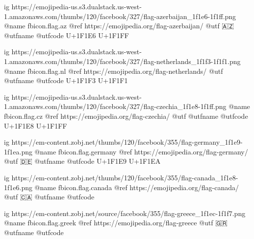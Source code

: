 	ig https://emojipedia-us.s3.dualstack.us-west-1.amazonaws.com/thumbs/120/facebook/327/flag-azerbaijan_1f1e6-1f1ff.png
	@name fbicon.flag.az
	@ref https://emojipedia.org/flag-azerbaijan/
	@utf 🇦🇿
	@utfname
	@utfcode U+1F1E6 U+1F1FF

	ig https://emojipedia-us.s3.dualstack.us-west-1.amazonaws.com/thumbs/120/facebook/327/flag-netherlands_1f1f3-1f1f1.png
	@name fbicon.flag.nl
	@ref https://emojipedia.org/flag-netherlands/
	@utf
	@utfname
	@utfcode  U+1F1F3 U+1F1F1

	ig https://emojipedia-us.s3.dualstack.us-west-1.amazonaws.com/thumbs/120/facebook/327/flag-czechia_1f1e8-1f1ff.png
	@name fbicon.flag.cz
	@ref https://emojipedia.org/flag-czechia/
	@utf
	@utfname
	@utfcode U+1F1E8 U+1F1FF

	ig https://em-content.zobj.net/thumbs/120/facebook/355/flag-germany_1f1e9-1f1ea.png
	@name fbicon.flag.germany
	@ref https://emojipedia.org/flag-germany/
	@utf 🇩🇪
	@utfname
	@utfcode U+1F1E9 U+1F1EA

	ig https://em-content.zobj.net/thumbs/120/facebook/355/flag-canada_1f1e8-1f1e6.png
	@name fbicon.flag.canada
	@ref https://emojipedia.org/flag-canada/
	@utf 🇨🇦
	@utfname
	@utfcode

	ig https://em-content.zobj.net/source/facebook/355/flag-greece_1f1ec-1f1f7.png
	@name fbicon.flag.greek
	@ref https://emojipedia.org/flag-greece
	@utf 🇬🇷
	@utfname
	@utfcode
	
\fi
